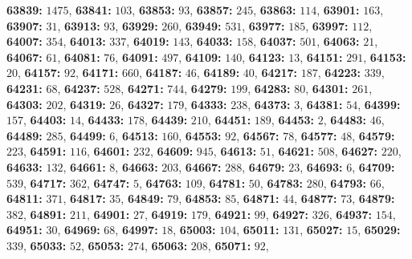 \textsf{\bfseries 63839:} $1475$, \textsf{\bfseries 63841:} $103$, \textsf{\bfseries 63853:} $93$, \textsf{\bfseries 63857:} $245$, \textsf{\bfseries 63863:} $114$, \textsf{\bfseries 63901:} $163$, \textsf{\bfseries 63907:} $31$, \textsf{\bfseries 63913:} $93$, \textsf{\bfseries 63929:} $260$, \textsf{\bfseries 63949:} $531$, \textsf{\bfseries 63977:} $185$, \textsf{\bfseries 63997:} $112$, \textsf{\bfseries 64007:} $354$, \textsf{\bfseries 64013:} $337$, \textsf{\bfseries 64019:} $143$, \textsf{\bfseries 64033:} $158$, \textsf{\bfseries 64037:} $501$, \textsf{\bfseries 64063:} $21$, \textsf{\bfseries 64067:} $61$, \textsf{\bfseries 64081:} $76$, \textsf{\bfseries 64091:} $497$, \textsf{\bfseries 64109:} $140$, \textsf{\bfseries 64123:} $13$, \textsf{\bfseries 64151:} $291$, \textsf{\bfseries 64153:} $20$, \textsf{\bfseries 64157:} $92$, \textsf{\bfseries 64171:} $660$, \textsf{\bfseries 64187:} $46$, \textsf{\bfseries 64189:} $40$, \textsf{\bfseries 64217:} $187$, \textsf{\bfseries 64223:} $339$, \textsf{\bfseries 64231:} $68$, \textsf{\bfseries 64237:} $528$, \textsf{\bfseries 64271:} $744$, \textsf{\bfseries 64279:} $199$, \textsf{\bfseries 64283:} $80$, \textsf{\bfseries 64301:} $261$, \textsf{\bfseries 64303:} $202$, \textsf{\bfseries 64319:} $26$, \textsf{\bfseries 64327:} $179$, \textsf{\bfseries 64333:} $238$, \textsf{\bfseries 64373:} $3$, \textsf{\bfseries 64381:} $54$, \textsf{\bfseries 64399:} $157$, \textsf{\bfseries 64403:} $14$, \textsf{\bfseries 64433:} $178$, \textsf{\bfseries 64439:} $210$, \textsf{\bfseries 64451:} $189$, \textsf{\bfseries 64453:} $2$, \textsf{\bfseries 64483:} $46$, \textsf{\bfseries 64489:} $285$, \textsf{\bfseries 64499:} $6$, \textsf{\bfseries 64513:} $160$, \textsf{\bfseries 64553:} $92$, \textsf{\bfseries 64567:} $78$, \textsf{\bfseries 64577:} $48$, \textsf{\bfseries 64579:} $223$, \textsf{\bfseries 64591:} $116$, \textsf{\bfseries 64601:} $232$, \textsf{\bfseries 64609:} $945$, \textsf{\bfseries 64613:} $51$, \textsf{\bfseries 64621:} $508$, \textsf{\bfseries 64627:} $220$, \textsf{\bfseries 64633:} $132$, \textsf{\bfseries 64661:} $8$, \textsf{\bfseries 64663:} $203$, \textsf{\bfseries 64667:} $288$, \textsf{\bfseries 64679:} $23$, \textsf{\bfseries 64693:} $6$, \textsf{\bfseries 64709:} $539$, \textsf{\bfseries 64717:} $362$, \textsf{\bfseries 64747:} $5$, \textsf{\bfseries 64763:} $109$, \textsf{\bfseries 64781:} $50$, \textsf{\bfseries 64783:} $280$, \textsf{\bfseries 64793:} $66$, \textsf{\bfseries 64811:} $371$, \textsf{\bfseries 64817:} $35$, \textsf{\bfseries 64849:} $79$, \textsf{\bfseries 64853:} $85$, \textsf{\bfseries 64871:} $44$, \textsf{\bfseries 64877:} $73$, \textsf{\bfseries 64879:} $382$, \textsf{\bfseries 64891:} $211$, \textsf{\bfseries 64901:} $27$, \textsf{\bfseries 64919:} $179$, \textsf{\bfseries 64921:} $99$, \textsf{\bfseries 64927:} $326$, \textsf{\bfseries 64937:} $154$, \textsf{\bfseries 64951:} $30$, \textsf{\bfseries 64969:} $68$, \textsf{\bfseries 64997:} $18$, \textsf{\bfseries 65003:} $104$, \textsf{\bfseries 65011:} $131$, \textsf{\bfseries 65027:} $15$, \textsf{\bfseries 65029:} $339$, \textsf{\bfseries 65033:} $52$, \textsf{\bfseries 65053:} $274$, \textsf{\bfseries 65063:} $208$, \textsf{\bfseries 65071:} $92$, 
